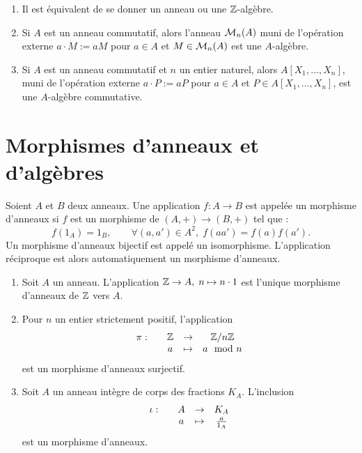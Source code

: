 \documentclass[]{report}
\begin{document}
\begin{ex}{}{}
    \begin{enumerate}
        \item Il est équivalent de se donner un anneau ou une $\mathbb{Z}$-algèbre.
        \item Si $A$ est un anneau commutatif, alors l'anneau $\mathcal{M}_n(A)$ muni de l'opération externe $a \cdot M := aM$ pour $a \in A$ et $M \in \mathcal{M}_n(A)$ est une $A$-algèbre.
        \item Si $A$ est un anneau commutatif et $n$ un entier naturel, alors $A[X_1, \ldots, X_n]$, muni de l'opération externe $a \cdot P := aP$ pour $a \in A$ et $P \in A[X_1, \ldots, X_n]$, est une $A$-algèbre commutative.
    \end{enumerate}
\end{ex}

\section{Morphismes d'anneaux et d'algèbres}

\begin{df}{}{}
    Soient $A$ et $B$ deux anneaux. Une application $f : A \to B$ est appelée un morphisme d'anneaux si $f$ est un morphisme de \grs $(A, +) \to (B, +)$ tel que :
    \[f(1_A) = 1_B, \qquad \forall (a, a') \in A^2, \; f(aa') = f(a)f(a').\]
    Un morphisme d'anneaux bijectif est appelé un isomorphisme. L'application réciproque est alors automatiquement un morphisme d'anneaux.
\end{df}

\begin{ex}{}{}
    \begin{enumerate}
        \item Soit $A$ un anneau. L'application $\mathbb{Z} \to A, \; n \mapsto n \cdot 1$ est l'unique morphisme d'anneaux de $\mathbb{Z}$ vers $A$.
        \item Pour $n$ un entier strictement positif, l'application
        \[\begin{array}{ccccc} \pi : & & \mathbb{Z} & \to & \mathbb{Z}/n\mathbb{Z} \\ & & a & \mapsto & a \mod n \end{array}\]
        est un morphisme d'anneaux surjectif.
        \item Soit $A$ un anneau intègre de corps des fractions $K_A$. L'inclusion
        \[\begin{array}{ccccc} \iota : & & A & \to & K_A \\ & & a & \mapsto & \frac{a}{1_A} \end{array}\]
        est un morphisme d'anneaux.
    \end{enumerate}
\end{ex}
\end{document}
